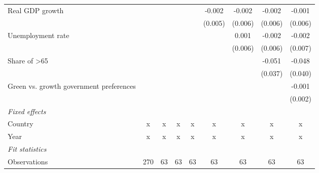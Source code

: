 \begin{table}[htbp]
\begin{tabular}{lcccccccc}
      Real GDP growth                                                                    &         &         &               &               & -0.002        & -0.002        & -0.002        & -0.001\\   
                                                                                         &         &         &               &               & (0.005)       & (0.006)       & (0.006)       & (0.006)\\   
      Unemployment rate                                                                  &         &         &               &               &               & 0.001         & -0.002        & -0.002\\   
                                                                                         &         &         &               &               &               & (0.006)       & (0.006)       & (0.007)\\   
      Share of >65                                                                       &         &         &               &               &               &               & -0.051        & -0.048\\   
                                                                                         &         &         &               &               &               &               & (0.037)       & (0.040)\\   
      Green vs. growth government preferences                                            &         &         &               &               &               &               &               & -0.001\\   
                                                                                         &         &         &               &               &               &               &               & (0.002)\\   
      \emph{Fixed effects}\\
      Country                                                                            & x       & x       & x             & x             & x             & x             & x             & x\\  
      Year                                                                               & x       & x       & x             & x             & x             & x             & x             & x\\  
      \midrule \emph{Fit statistics}\\
      Observations                                                                       & 270     & 63      & 63            & 63            & 63            & 63            & 63            & 63\\  

\end{tabular}
\end{table}
